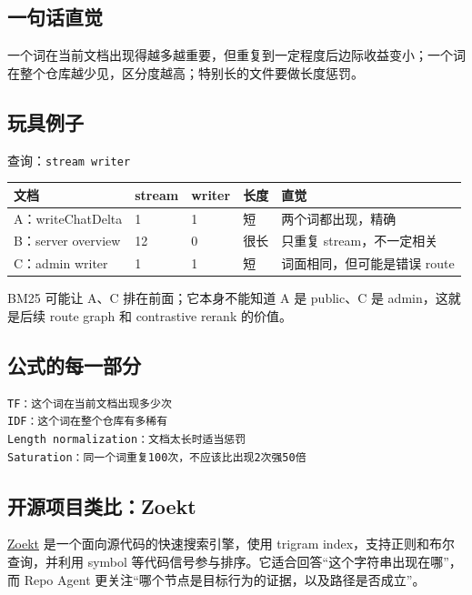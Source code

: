 \documentclass[UTF8,12pt,openany]{ctexbook}
\begin{document}
\subsection{一句话直觉}

一个词在当前文档出现得越多越重要，但重复到一定程度后边际收益变小；一个词在整个仓库越少见，区分度越高；特别长的文件要做长度惩罚。\par

\subsection{玩具例子}

查询：\texttt{stream writer}\par

\begin{center}
\small
\begin{longtable}{|p{}|p{}|p{}|p{}|p{}|}
\toprule
文档 & stream & writer & 长度 & 直觉 \\
\midrule
A：writeChatDelta & 1 & 1 & 短 & 两个词都出现，精确 \\
B：server overview & 12 & 0 & 很长 & 只重复 stream，不一定相关 \\
C：admin writer & 1 & 1 & 短 & 词面相同，但可能是错误 route \\
\bottomrule
\end{longtable}
\end{center}

BM25 可能让 A、C 排在前面；它本身不能知道 A 是 public、C 是 admin，这就是后续 route graph 和 contrastive rerank 的价值。\par

\subsection{公式的每一部分}

\begin{lstlisting}
TF：这个词在当前文档出现多少次
IDF：这个词在整个仓库有多稀有
Length normalization：文档太长时适当惩罚
Saturation：同一个词重复100次，不应该比出现2次强50倍
\end{lstlisting}

\subsection{开源项目类比：Zoekt}

\href{https://github.com/sourcegraph/zoekt}{Zoekt} 是一个面向源代码的快速搜索引擎，使用 trigram index，支持正则和布尔查询，并利用 symbol 等代码信号参与排序。它适合回答“这个字符串出现在哪”，而 Repo Agent 更关注“哪个节点是目标行为的证据，以及路径是否成立”。\par
\end{document}

